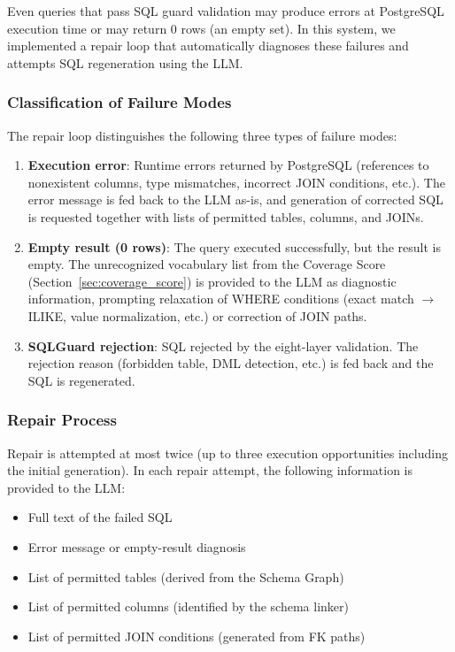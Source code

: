 \documentclass[5p,twocolumn]{elsarticle}
\begin{document}
Even queries that pass SQL guard validation
may produce errors at PostgreSQL execution time or
may return 0 rows (an empty set).
In this system, we implemented a repair loop that automatically diagnoses these failures
and attempts SQL regeneration using the LLM.

\subsubsection{Classification of Failure Modes}

The repair loop distinguishes the following three types of failure modes:

\begin{enumerate}
  \item \textbf{Execution error}: Runtime errors returned by PostgreSQL
    (references to nonexistent columns, type mismatches, incorrect JOIN conditions, etc.).
    The error message is fed back to the LLM as-is, and
    generation of corrected SQL is requested together with lists of permitted tables, columns, and JOINs.
  \item \textbf{Empty result (0 rows)}: The query executed successfully, but the result is empty.
    The unrecognized vocabulary list from the Coverage Score (Section~\ref{sec:coverage_score})
    is provided to the LLM as diagnostic information,
    prompting relaxation of WHERE conditions (exact match $\to$ ILIKE, value normalization, etc.) or
    correction of JOIN paths.
  \item \textbf{SQLGuard rejection}: SQL rejected by the eight-layer validation.
    The rejection reason (forbidden table, DML detection, etc.) is fed back and the SQL is regenerated.
\end{enumerate}

\subsubsection{Repair Process}

Repair is attempted at most twice (up to three execution opportunities including the initial generation).
In each repair attempt, the following information is provided to the LLM:

\begin{itemize}
  \item Full text of the failed SQL
  \item Error message or empty-result diagnosis
  \item List of permitted tables (derived from the Schema Graph)
  \item List of permitted columns (identified by the schema linker)
  \item List of permitted JOIN conditions (generated from FK paths)
\end{itemize}
\end{document}
